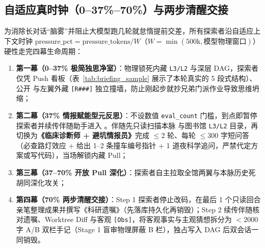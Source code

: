 \documentclass[11pt,a4paper]{ctexart}
\theoremstyle{remark}
\begin{document}
\subsection{自适应真时钟（0--37\%--70\%）与两步清醒交接}
为消除长对话“脑雾”并阻止大模型跑几轮就怠惰提前交差，所有探索者沿自适应上下文时钟 $\text{pressure\_pct} = \text{pressure\_tokens} / W$（$W = \min(500\text{k}, \text{模型物理窗口})$）硬性走完四幕生命周期：
\begin{enumerate}
    \item \textbf{第一幕（0--37\% 极简独思净室）}：物理锁死内藏 \texttt{L3/L2} 与深层 DAG，探索者仅凭 Push 看板（表~\ref{tab:briefing_sample} 展示了本轮真实的 5 段式结构）、公开  与左翼外藏 \texttt{[R\#\#\#]} 独立撞墙，防止刚起步就抄兄弟门派作业导致思维坍缩；
    \item \textbf{第二幕（37\% 情报赋能型元反思）}：不设数值 \texttt{eval\_count} 门槛，到点即暂停探索者并续传伴随助手进入 。伴随先只读扫描本脉  与图书馆 \texttt{L3/L2} 目录，再切换为\textbf{《临床诊断师 + 避坑情报员》}完成 $\le 2$ 轮、每轮 $\le 300$ 字短问答（必查路灯效应 + 给出 1--2 条撞车编号指针 + 1 道夜科学追问，严禁代定方案或写代码），当场解锁内藏 Pull；
    \item \textbf{第三幕（37--70\% 开放 Pull 深化）}：探索者自主拉取全馆两翼与本脉历史死胡同深化攻关；
    \item \textbf{第四幕（70\% 两步清醒交接）}：Step 1 探索者停止改码，在最后 1 个只读回合亲笔整理成果并撰写《科研遗嘱》（先落库持久化再销毁）；Step 2 续传伴随核对遗嘱、Worktree Diff 与客观 \texttt{[Obs]}，将客观事实与主观猜想拆分为 $<2000$ 字 A/B 双栏手记（Stage 1 盲审物理屏蔽 B 栏），独占写入 DAG 后双会话一同销毁。
\end{enumerate}
\end{document}
